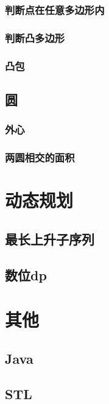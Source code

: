 \documentclass[twocolumn,a4]{article}%
\begin{document}
    \subsubsection{判断点在任意多边形内}
    
    \subsubsection{判断凸多边形}
    
    \subsubsection{凸包}
    
\subsection{圆}
    \subsubsection{外心}
    
    \subsubsection{两圆相交的面积}
    
\section{动态规划}
\subsection{最长上升子序列}

\subsection{数位dp}

\section{其他}
\subsection{Java}

\subsection{STL}
\end{document}
